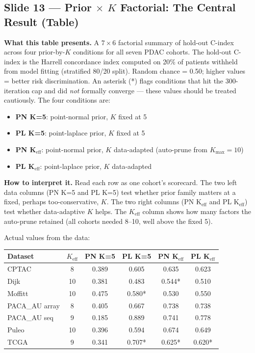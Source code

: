 \documentclass[11pt]{article}
\begin{document}
\subsection*{Slide 13 --- Prior $\times$ $K$ Factorial: The Central Result (Table)}

\textbf{What this table presents.} A $7 \times 6$ factorial summary of hold-out C-index across four prior-by-$K$ conditions for all seven PDAC cohorts. The hold-out C-index is the Harrell concordance index computed on 20\% of patients withheld from model fitting (stratified 80/20 split). Random chance = 0.50; higher values = better risk discrimination. An asterisk (*) flags conditions that hit the 300-iteration cap and did \emph{not} formally converge --- these values should be treated cautiously. The four conditions are:

\begin{itemize}
  \item \textbf{PN K=5}: point-normal prior, $K$ fixed at 5
  \item \textbf{PL K=5}: point-laplace prior, $K$ fixed at 5
  \item \textbf{PN K$_\text{eff}$}: point-normal prior, $K$ data-adapted (auto-prune from $K_\text{max} = 10$)
  \item \textbf{PL K$_\text{eff}$}: point-laplace prior, $K$ data-adapted
\end{itemize}

\textbf{How to interpret it.} Read each row as one cohort's scorecard. The two left data columns (PN K=5 and PL K=5) test whether prior family matters at a fixed, perhaps too-conservative, $K$. The two right columns (PN K$_\text{eff}$ and PL K$_\text{eff}$) test whether data-adaptive $K$ helps. The $K_\text{eff}$ column shows how many factors the auto-prune retained (all cohorts needed 8--10, well above the fixed 5).

Actual values from the data:
\begin{center}
\begin{tabular}{lccccc}
\textbf{Dataset} & \textbf{$K_\text{eff}$} & \textbf{PN K=5} & \textbf{PL K=5} & \textbf{PN K$_\text{eff}$} & \textbf{PL K$_\text{eff}$} \\
\hline
CPTAC      & 8  & 0.389 & 0.605  & 0.635  & 0.623 \\
Dijk       & 10 & 0.381 & 0.483  & 0.544* & 0.510 \\
Moffitt    & 10 & 0.475 & 0.580* & 0.530  & 0.550 \\
PACA\_AU array & 8 & 0.405 & 0.667 & 0.738 & 0.738 \\
PACA\_AU seq & 9 & 0.185 & 0.889  & 0.741  & 0.778 \\
Puleo      & 10 & 0.396 & 0.594  & 0.674  & 0.649 \\
TCGA       & 9  & 0.341 & 0.707* & 0.625* & 0.620* \\
\end{tabular}
\end{center}
\end{document}
